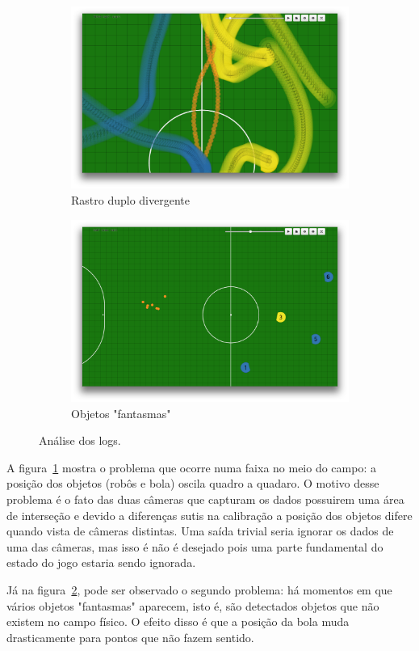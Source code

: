 \begin{figure}[thpb]
  \centering
  \begin{subfigure}[b]{0.49\textwidth}
    \includegraphics[width=\textwidth]{figuras/log_rastro.png}
    \caption{Rastro duplo divergente}\label{fig:log_rastro}
  \end{subfigure}
  \begin{subfigure}[b]{0.49\textwidth}
    \includegraphics[width=\textwidth]{figuras/log_multi.png}
    \caption{Objetos "fantasmas"}\label{fig:log_multi}
  \end{subfigure}
  \caption{Análise dos logs.}\label{fig:logs}
\end{figure}

A figura~\ref{fig:log_rastro} mostra o problema que ocorre numa faixa no meio do campo: a
posição dos objetos (robôs e bola) oscila quadro a quadaro. O motivo desse
problema é o fato das duas câmeras que capturam os dados possuirem uma área de
interseção e devido a diferenças sutis na calibração a posição dos objetos
difere quando vista de câmeras distintas. Uma saída trivial seria ignorar os
dados de uma das câmeras, mas isso é não é desejado pois uma parte fundamental
do estado do jogo estaria sendo ignorada.

Já na figura~\ref{fig:log_multi}, pode ser observado o segundo problema: há momentos em que
vários objetos "fantasmas" aparecem, isto é, são detectados objetos que não
existem no campo físico. O efeito disso é que a posição da bola muda
drasticamente para pontos que não fazem sentido.


